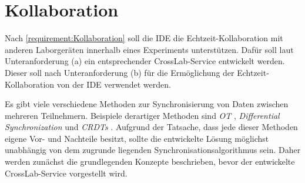\section{Kollaboration}\label{section:konzeption:kollaboration}

\usetikzlibrary{arrows.meta}


Nach \autoref{requirement:Kollaboration} soll die IDE die Echtzeit-Kollaboration mit anderen Laborgeräten innerhalb eines Experiments unterstützen. Dafür soll laut Unteranforderung (a) ein entsprechender CrossLab-Service entwickelt werden. Dieser soll nach Unteranforderung (b) für die Ermöglichung der Echtzeit-Kollaboration von der IDE verwendet werden.

Es gibt viele verschiedene Methoden zur Synchronisierung von Daten zwischen mehreren Teilnehmern. Beispiele derartiger Methoden sind \emph{\ac{OT}} \cite{sun_operational_1998}, \emph{Differential Synchronization} \cite{fraser_differential_2009} und \emph{\acp{CRDT}} \cite{shapiro_conflict-free_2011}. Aufgrund der Tatsache, dass jede dieser Methoden eigene Vor- und Nachteile besitzt, sollte die entwickelte Lösung möglichst unabhängig von dem zugrunde liegenden Synchronisationsalgorithmus sein. Daher werden zunächst die grundlegenden Konzepte beschrieben, bevor der entwickelte CrossLab-Service vorgestellt wird.

